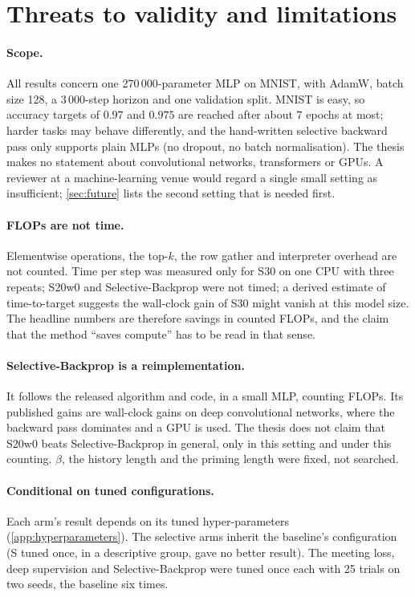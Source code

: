 \section{Threats to validity and limitations}\label{sec:limitations}
\paragraph{Scope.} All results concern one 270\,000-parameter MLP on MNIST, with AdamW, batch size 128, a 3\,000-step horizon and one validation split. MNIST is easy, so accuracy targets of $0.97$ and $0.975$ are reached after about $7$ epochs at most; harder tasks may behave differently, and the hand-written selective backward pass only supports plain MLPs (no dropout, no batch normalisation). The thesis makes no statement about convolutional networks, transformers or GPUs. A reviewer at a machine-learning venue would regard a single small setting as insufficient; \cref{sec:future} lists the second setting that is needed first.

\paragraph{FLOPs are not time.} Elementwise operations, the top-$k$, the row gather and interpreter overhead are not counted. Time per step was measured only for S30 on one CPU with three repeats; S20w0 and Selective-Backprop were not timed; a derived estimate of time-to-target suggests the wall-clock gain of S30 might vanish at this model size. The headline numbers are therefore savings in counted FLOPs, and the claim that the method ``saves compute'' has to be read in that sense.

\paragraph{Selective-Backprop is a reimplementation.} It follows the released algorithm and code, in a small MLP, counting FLOPs. Its published gains are wall-clock gains on deep convolutional networks, where the backward pass dominates and a GPU is used. The thesis does not claim that S20w0 beats Selective-Backprop in general, only in this setting and under this counting. $\beta$, the history length and the priming length were fixed, not searched.

\paragraph{Conditional on tuned configurations.} Each arm's result depends on its tuned hyper-parameters (\cref{app:hyperparameters}). The selective arms inherit the baseline's configuration (S tuned once, in a descriptive group, gave no better result). The meeting loss, deep supervision and Selective-Backprop were tuned once each with 25 trials on two seeds, the baseline six times.

